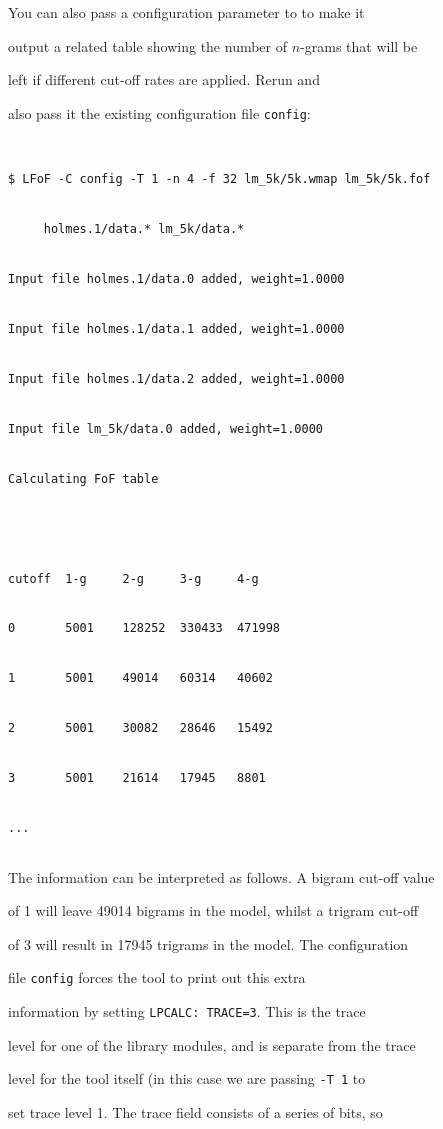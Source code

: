 You can also pass a configuration parameter to  to make it


output a related table showing the number of $n$-grams that will be


left if different cut-off rates are applied.  Rerun  and


also pass it the existing configuration file {\tt config}:


\begin{verbatim}


$ LFoF -C config -T 1 -n 4 -f 32 lm_5k/5k.wmap lm_5k/5k.fof


     holmes.1/data.* lm_5k/data.*


Input file holmes.1/data.0 added, weight=1.0000


Input file holmes.1/data.1 added, weight=1.0000


Input file holmes.1/data.2 added, weight=1.0000


Input file lm_5k/data.0 added, weight=1.0000


Calculating FoF table





cutoff  1-g     2-g     3-g     4-g


0       5001    128252  330433  471998 


1       5001    49014   60314   40602 


2       5001    30082   28646   15492 


3       5001    21614   17945   8801 


...


\end{verbatim} %


The information can be interpreted as follows.  A bigram cut-off value


of 1 will leave 49014 bigrams in the model, whilst a trigram cut-off


of 3 will result in 17945 trigrams in the model.  The configuration


file \texttt{config} forces the tool to print out this extra


information by setting \texttt{LPCALC: TRACE=3}.  This is the trace


level for one of the library modules, and is separate from the trace


level for the tool itself (in this case we are passing {\tt -T 1} to


set trace level 1.  The trace field consists of a series of bits, so


